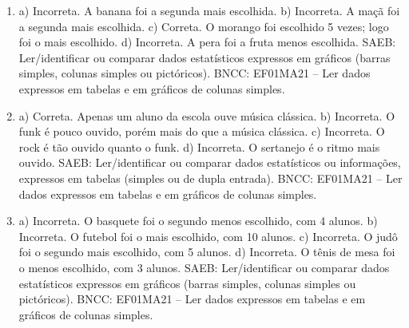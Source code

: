 \begin{enumerate}
\item
a) Incorreta. A banana foi a segunda mais escolhida.
b) Incorreta. A maçã foi a segunda mais escolhida.
c) Correta. O morango foi escolhido 5 vezes; logo foi o mais escolhido.
d) Incorreta. A pera foi a fruta menos escolhida.
SAEB: Ler/identificar ou comparar dados estatísticos expressos
em gráficos (barras simples, colunas simples ou pictóricos).
BNCC: EF01MA21 -- Ler dados expressos em tabelas e em gráficos de colunas
simples.

\item
a) Correta. Apenas um aluno da escola ouve música clássica.
b) Incorreta. O funk é pouco ouvido, porém mais do que a música clássica.
c) Incorreta. O rock é tão ouvido quanto o funk.
d) Incorreta. O sertanejo é o ritmo mais ouvido.
SAEB: Ler/identificar ou comparar dados estatísticos ou informações, expressos
em tabelas (simples ou de dupla entrada).
BNCC: EF01MA21 -- Ler dados expressos em tabelas e em gráficos de colunas
simples.

\item
a) Incorreta. O basquete foi o segundo menos escolhido, com 4 alunos.
b) Incorreta. O futebol foi o mais escolhido, com 10 alunos.
c) Incorreta. O judô foi o segundo mais escolhido, com 5 alunos.
d) Incorreta. O tênis de mesa foi o menos escolhido, com 3 alunos.
SAEB:
Ler/identificar ou comparar dados estatísticos expressos em gráficos
(barras simples, colunas simples ou pictóricos).
BNCC: EF01MA21 -- Ler dados expressos em tabelas e em gráficos de colunas
simples.
\end{enumerate}


